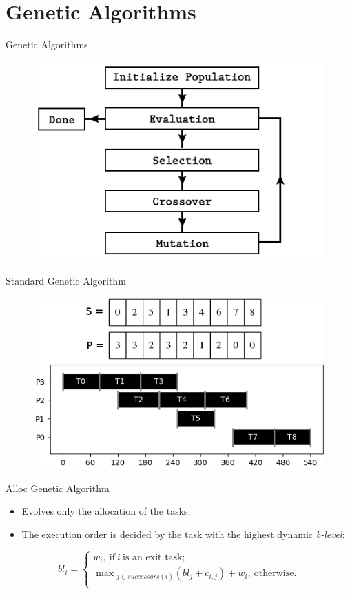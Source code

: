 \documentclass{beamer}
\begin{document}
\section{Genetic Algorithms}
\begin{frame}{Genetic Algorithms}
\begin{figure}
\includegraphics[width=.8\textwidth]{ga.png}
\end{figure}
\end{frame}

\begin{frame}{Standard Genetic Algorithm}
\begin{figure}
\includegraphics[width=\textwidth]{gantt_ga.png}
\end{figure}
\end{frame}

\begin{frame}{Alloc Genetic Algorithm}
\begin{itemize}
\item Evolves only the allocation of the tasks.
\item The execution order is decided by the task with the highest dynamic \textit{b-level}:
\end{itemize}
\[bl_{i} = \left\{
\begin{array}{ll}
w_{i},~\mbox{if}~i~\mbox{is~an~exit~task;} \\
\max{_{j \in successors(i)} (bl_{j} + c_{i,j}) + w_{i}},~\mbox{otherwise.}\\
\end{array}\right.
\label{eq:policy_sched}\]
\end{frame}
\end{document}
